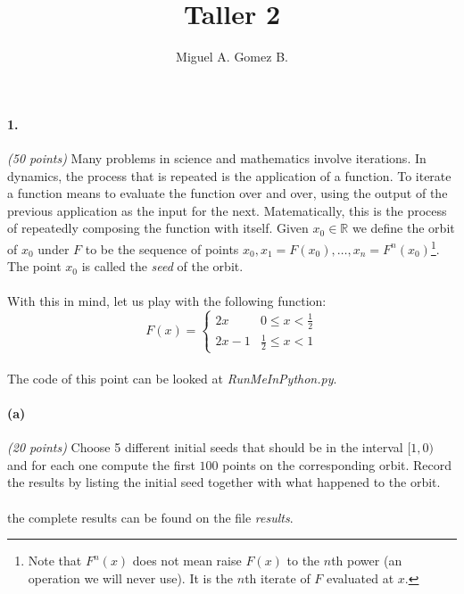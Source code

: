 \documentclass{article}
\title{Taller 2}
\author{Miguel A. Gomez B.}
\begin{document}
	\maketitle
\paragraph{1.} \textit{(50 points)} Many problems in science and mathematics involve iterations. In dynamics, the process that is repeated is the application of a function. To iterate a function means to evaluate the function over and over, using the output of the previous application as the input for the next. Matematically, this is the process of repeatedly composing the function with itself. Given $x_0 \in \mathbb{R}$ we define the orbit of $x_0$ under $F$ to be the sequence of points $x_0, x_1 = F(x_0),\dots, x_n = F^n(x_0)$\footnote{Note that $F^n(x)$ does not mean raise $F(x)$ to the $n$th power (an operation we will never use). It is the $n$th iterate of $F$ evaluated at $x$.}. The point $x_0$ is called the \textit{seed} of the orbit.
\paragraph{}With this in mind, let us play with the following function:
\[ 
	F(x) = 
	\begin{cases} 
		2x & 0 \leq x < \frac{1}{2} \\
		2x - 1 & \frac{1}{2} \leq x < 1
	\end{cases}
\]
\paragraph{} The code of this point can be looked at \textit{RunMeInPython.py}.
\paragraph{(a)}\textit{(20 points)} Choose 5 different initial seeds that should be in the interval $[1,0)$ and for each one compute the first $100$ points on the corresponding orbit. Record the results by listing the initial seed together with what happened to the orbit.
\begin{center}
\end{center}
\paragraph{} the complete results can be found on the file \textit{results}.
\end{document}
